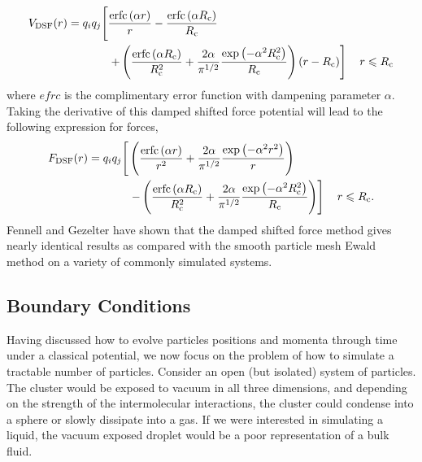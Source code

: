 \begin{equation}
\begin{split}
V_\mathrm{DSF}(r) = q_iq_j\Biggr{[} & \frac{\mathrm{erfc}\left(\alpha r \right)}{r} -\frac{\mathrm{erfc}\left(\alpha R_\mathrm{c} \right) }{R_\mathrm{c}} \\
 & \left. +\left(\frac{\mathrm{erfc}\left(\alpha
R_\mathrm{c}\right)}{R_\mathrm{c}^2}+\frac{2\alpha}{\pi^{1/2}}\frac{\exp\left(-\alpha^2R_\mathrm{c}^2\right)}{R_\mathrm{c}}\right)\left(r-R_\mathrm{c}\right)
\right] \quad r\leqslant R_\textrm{c} 
\label{eq:DSFPot}
\end{split}
\end{equation}
where $efrc$ is the complimentary error function with dampening
parameter $\alpha$. Taking the derivative of this damped shifted force
potential will lead to the following expression for forces,
\begin{equation}
\begin{split}
F_\mathrm{DSF}(r) =
q_iq_j\Biggr{[}&\left(\frac{\textrm{erfc}\left(\alpha r\right)}{r^2}+\frac{2\alpha}{\pi^{1/2}}\frac{\exp{\left(-\alpha^2r^2\right)}}{r}\right) \\ &\left.-\left(\frac{\textrm{erfc}\left(\alpha R_{\textrm{c}}\right)}{R_{\textrm{c}}^2}+\frac{2\alpha}{\pi^{1/2}}\frac{\exp{\left(-\alpha^2R_{\textrm{c}}^2
\right)}}{R_{\textrm{c}}}\right)\right] \quad r\leqslant R_\textrm{c}.
\label{eq:DSFForces}
\end{split}
\end{equation}
Fennell and Gezelter have shown that the damped shifted force method
gives nearly identical results as compared with the smooth particle
mesh Ewald method on a variety of commonly simulated
systems.\cite{Fennell2006}

\subsection{Boundary Conditions}
Having discussed how to evolve particles positions and momenta through
time under a classical potential, we now focus on the problem of how
to simulate a tractable number of particles. Consider an open (but
isolated) system of particles. The cluster would be exposed to vacuum
in all three dimensions, and depending on the strength of the
intermolecular interactions, the cluster could condense into a sphere
or slowly dissipate into a gas. If we were interested in simulating a
liquid, the vacuum exposed droplet would be a poor representation of a
bulk fluid.

